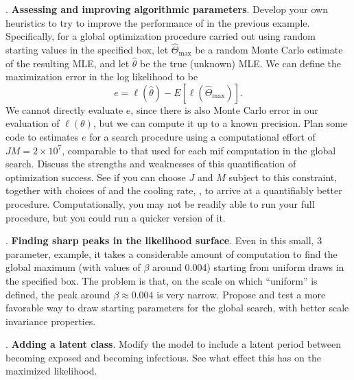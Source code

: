 \documentclass{beamer}\usepackage[]{graphicx}\usepackage[]{color}
\newcommand\answer[2]{#1} %
\begin{document}
 \begin{frame}[fragile]

\myquestion. {\bf Assessing and improving algorithmic parameters}.
Develop your own heuristics to try to improve the performance of  in the previous example. Specifically, for a global optimization procedure carried out using random starting values in the specified box, let $\hat\Theta_\mathrm{max}$ be a random Monte Carlo estimate of the resulting MLE, and let $\hat\theta$ be the true (unknown) MLE. We can define the maximization error in the log likelihood to be
$$e = \ell(\hat\theta) - E[\ell(\hat\Theta_\mathrm{max})].$$
We cannot directly evaluate $e$, since there is also Monte Carlo error in our evaluation of $\ell(\theta)$, but we can compute it up to a known precision. Plan some code to estimates $e$ for a search procedure using a computational effort of $JM=2\times 10^7$, comparable to that used for each mif computation in the global search. Discuss the strengths and weaknesses of this quantification of optimization success. See if you can choose $J$ and $M$ subject to this constraint, together with choices of  and the cooling rate, , to arrive at a quantifiably better procedure. Computationally, you may not be readily able to run your full procedure, but you could run a quicker version of it.

\answer{\vspace{30mm}}{todo}

\end{frame}  

 \begin{frame}[fragile]

\myquestion. {\bf Finding sharp peaks in the likelihood surface}. Even in this small, 3 parameter, example, it takes a considerable amount of computation to find the global maximum (with values of $\beta$ around 0.004) starting from uniform draws in the specified box. The problem is that, on the scale on which ``uniform'' is defined, the peak around $\beta\approx 0.004$ is very narrow. Propose and test a more favorable way to draw starting parameters for the global search, with better scale invariance properties.

\answer{\vspace{50mm}}{todo}

\end{frame}   

\begin{frame}[fragile]

\myquestion. {\bf Adding a latent class}. Modify the model to include a latent period between becoming exposed and becoming infectious. See what effect this has on the maximized likelihood.

\answer{\vspace{50mm}}{todo}

\end{frame}
\end{document}
